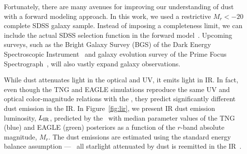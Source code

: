 Fortunately, there are many avenues for improving our understanding of dust
with a forward modeling approach. In this work, we used a restrictive $M_r <
-20$ complete SDSS galaxy sample. 
Instead of imposing a completeness limit, 
we can include the actual SDSS selection function in the forward 
model~\citep[\eg~][]{dickey2020}. 
Upcoming surveys, such as the Bright Galaxy Survey (BGS) of the Dark Energy
Spectroscopic Instrument~\citep[DESI;][]{desicollaboration2016, ruiz-macias2020} 
and galaxy evolution survey of the Prime Focus
Spectrograph~\citep[PFS;][]{takada2014,tamura2016}, will also vastly expand galaxy
observations. 

While dust attenuates light in the optical and UV, it emits light in
IR. In fact, even though the TNG and EAGLE simulations reproduce the same UV and
optical color-magnitude relations with the \eda, they predict significantly 
different dust emission in the IR. In Figure~\ref{fig:lir}, we present IR dust
emission luminosity, $L_{\rm IR}$, predicted by the \eda~with median parameter values of 
the TNG (blue) and EAGLE (green) posteriors as a function of the $r$-band 
absolute magnitude, $M_r$. The dust emissions are estimated using the standard
energy balance assumption --- \ie~all starlight attenuated by dust is reemitted 
in the IR~\citep{dacunha2008}. 


